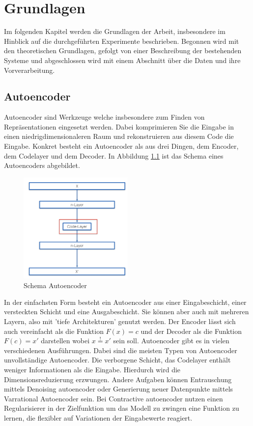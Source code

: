 \chapter{Grundlagen}
\label{chap:Grundlagen}
Im folgenden Kapitel werden die Grundlagen der Arbeit, insbesondere im Hinblick auf die durchgeführten Experimente beschrieben. Begonnen wird mit den theoretischen Grundlagen, gefolgt von einer Beschreibung der bestehenden Systeme und abgeschlossen wird mit einem Abschnitt über die Daten und ihre Vorverarbeitung.

	\section{Autoencoder}
	\label{sec:ConvolutionalAutoencoder}		
	Autoencoder \cite{D.E.Rumelhart.1987} sind Werkzeuge welche insbesondere zum Finden von Repräsentationen eingesetzt werden. Dabei komprimieren Sie die Eingabe in einen niedrigdimensionaleren Raum und rekonstruieren aus diesem Code die Eingabe. Konkret besteht ein Autoencoder als aus drei Dingen, dem Encoder, dem Codelayer und dem Decoder. In Abbildung \ref{img:SchemaCAE} ist das Schema eines Autoencoders abgebildet.
			\begin{figure}[h]
			
				\centering
				\includegraphics[width=0.5\textwidth, center]{bilder/Schema_Autoencoders/Schema_CAE.png}
				\caption[Schema Autoencoder]{Schema Autoencoder}
				\label{img:SchemaCAE}
			\end{figure} 
	In der einfachsten Form besteht ein Autoencoder aus einer Eingabeschicht, einer versteckten Schicht und eine Ausgabeschicht. Sie können aber auch mit mehreren Layern, also mit 'tiefe Architekturen' genutzt werden. \cite{Hinton.2006} Der Encoder lässt sich auch vereinfacht als die Funktion $F(x)=c$ und der Decoder als die Funktion $ F(c)=x'$ darstellen wobei $x\stackrel{!}{=}x'$ sein soll. 
	Autoencoder gibt es in vielen verschiedenen Ausführungen. Dabei sind die meisten Typen von Autoencoder unvollständige Autoencoder. Die verborgene Schicht, das Codelayer enthält weniger Informationen als die Eingabe. Hierdurch wird die Dimensionsreduzierung erzwungen. Andere Aufgaben können Entrauschung mittels Denoising autoencoder \cite{Vincent.2008} oder Generierung neuer Datenpunkte mittels Varrational Autoencoder \cite{Kingma.2019} sein. Bei  Contractive autoencoder \cite{Rifai.201} nutzen einen Regularisierer in der Zielfunktion um das Modell zu zwingen eine Funktion zu lernen, die flexibler auf Variationen der Eingabewerte reagiert.   	

